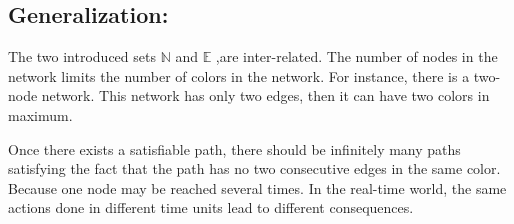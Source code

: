 \subsection*{Generalization:}
The two introduced sets $\mathbb{N}$ and $\mathbb{E}$ ,are inter-related. The number of nodes in the network limits the number of colors in the network. For instance, there is a two-node network. This network has only two edges, then it can have two colors in maximum.

Once there exists a satisfiable path, there should be infinitely many paths satisfying the fact that the path has no two consecutive edges in the same color. Because one node may be reached several times. In the real-time world, the same actions done in different time units lead to different consequences.




